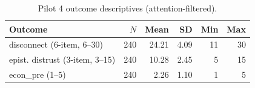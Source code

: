 \begin{table}[!h]
\centering
\caption{\label{tab:p4outcomes}Pilot 4 outcome descriptives (attention-filtered).}
\centering
\fontsize{10}{12}\selectfont
\begin{tabular}[t]{lrrrrr}
\toprule
Outcome & $N$ & Mean & SD & Min & Max\\
\midrule
disconnect (6-item, 6--30) & 240 & 24.21 & 4.09 & 11 & 30\\
epist. distrust (3-item, 3--15) & 240 & 10.28 & 2.45 & 5 & 15\\
econ\_pre (1--5) & 240 & 2.26 & 1.10 & 1 & 5\\
\bottomrule
\end{tabular}
\end{table}
